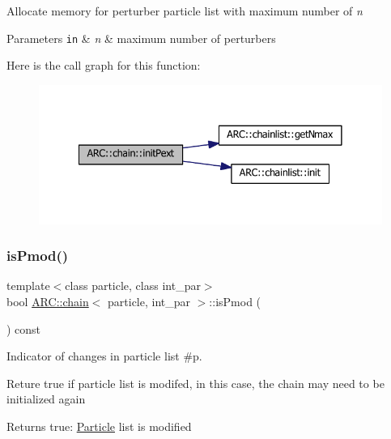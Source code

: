 Allocate memory for perturber particle list with maximum number of {\itshape n} 
\begin{DoxyParams}[1]{Parameters}
\mbox{\tt in}  & {\em n} & maximum number of perturbers \\
\hline
\end{DoxyParams}
Here is the call graph for this function\+:
\nopagebreak
\begin{figure}[H]
\begin{center}
\leavevmode
\includegraphics[width=341pt]{classARC_1_1chain_a1c6de84a911feff1425dfb59e7a89087_cgraph}
\end{center}
\end{figure}
\hypertarget{classARC_1_1chain_a29ff9707fe94a554966c885d9bafa819}{}\label{classARC_1_1chain_a29ff9707fe94a554966c885d9bafa819} 
\subsubsection{\texorpdfstring{is\+Pmod()}{isPmod()}}
{\footnotesize\ttfamily template$<$class particle, class int\+\_\+par$>$ \\
bool \hyperlink{classARC_1_1chain}{A\+R\+C\+::chain}$<$ particle, int\+\_\+par $>$\+::is\+Pmod (\begin{DoxyParamCaption}{ }\end{DoxyParamCaption}) const\hspace{0.3cm}{\ttfamily [inline]}}



Indicator of changes in particle list \#p. 

Reture true if particle list is modifed, in this case, the chain may need to be initialized again \begin{DoxyReturn}{Returns}
true\+: \hyperlink{classParticle}{Particle} list is modified 
\end{DoxyReturn}
\hypertarget{classARC_1_1chain_a7de218a1874b150ee44a05aa9d7b7b6d}{}\label{classARC_1_1chain_a7de218a1874b150ee44a05aa9d7b7b6d} 
